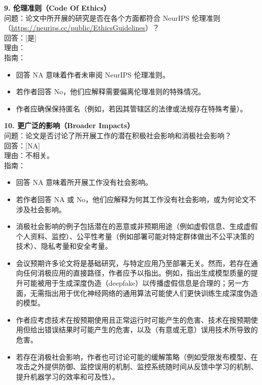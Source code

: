 \documentclass[11pt,UTF8,fontset=fandol]{ctexart}
\begin{document}
\textbf{9. 伦理准则（Code Of Ethics）}\\
问题：论文中所开展的研究是否在各个方面都符合 NeurIPS 伦理准则（\url{https://neurips.cc/public/EthicsGuidelines}）？\\
回答：[是]\\
理由：\\
指南：
\begin{itemize}[leftmargin=1.5em,itemsep=1pt]
\item 回答 NA 意味着作者未审阅 NeurIPS 伦理准则。
\item 若作者回答 No，他们应解释需要偏离伦理准则的特殊情况。
\item 作者应确保保持匿名（例如，若因其管辖区的法律或法规存在特殊考量）。
\end{itemize}

\textbf{10. 更广泛的影响（Broader Impacts）}\\
问题：论文是否讨论了所开展工作的潜在积极社会影响和消极社会影响？\\
回答：[NA]\\
理由：不相关。\\
指南：
\begin{itemize}[leftmargin=1.5em,itemsep=1pt]
\item 回答 NA 意味着所开展工作没有社会影响。
\item 若作者回答 NA 或 No，他们应解释为何其工作没有社会影响，或为何论文不涉及社会影响。
\item 消极社会影响的例子包括潜在的恶意或非预期用途（例如虚假信息、生成虚假个人资料、监控）、公平性考量（例如部署可能对特定群体做出不公平决策的技术）、隐私考量和安全考量。
\item 会议预期许多论文将是基础研究，与特定应用乃至部署无关。然而，若存在通向任何消极应用的直接路径，作者应予以指出。例如，指出生成模型质量的提升可能被用于生成深度伪造（deepfake）以传播虚假信息是合理的；另一方面，无需指出用于优化神经网络的通用算法可能使人们更快训练生成深度伪造的模型。
\item 作者应考虑技术在按预期使用且正常运行时可能产生的危害、技术在按预期使用但给出错误结果时可能产生的危害，以及（有意或无意）误用技术所导致的危害。
\item 若存在消极社会影响，作者也可讨论可能的缓解策略（例如受限发布模型、在攻击之外提供防御、监控误用的机制、监控系统随时间从反馈中学习的机制、提升机器学习的效率和可及性）。
\end{itemize}
\end{document}

